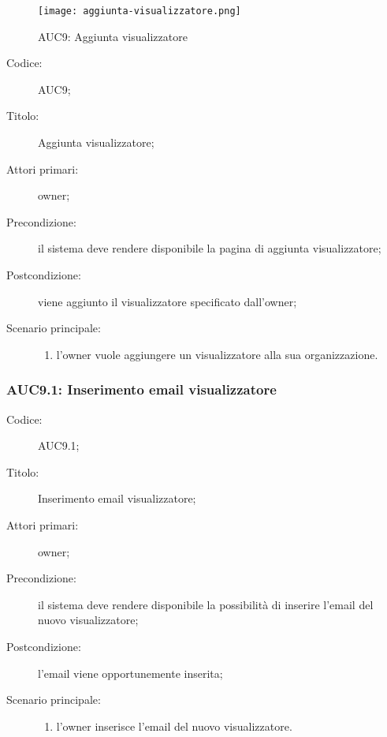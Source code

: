 \documentclass[../../../analisi-dei-requisiti.tex]{subfiles}
\begin{document}
\begin{figure}[H]
  \centering
  \texttt{[image: aggiunta-visualizzatore.png]}
  \caption{AUC9: Aggiunta visualizzatore}%
  \label{fig:AUC9}
\end{figure}

\begin{description}
  \item[Codice:] AUC9;
  \item[Titolo:] Aggiunta visualizzatore;
  \item[Attori primari:] owner;
  \item[Precondizione:] il sistema deve rendere disponibile la pagina di aggiunta visualizzatore;
  \item[Postcondizione:] viene aggiunto il visualizzatore specificato dall'owner;
  \item[Scenario principale:]
  \begin{enumerate}
    \item l'owner vuole aggiungere un visualizzatore alla sua organizzazione.
  \end{enumerate}
\end{description}

\subsubsection{AUC9.1: Inserimento email visualizzatore}%
\label{subs:AUC9.1}
\begin{description}
  \item[Codice:] AUC9.1;
  \item[Titolo:] Inserimento email visualizzatore;
  \item[Attori primari:] owner;
  \item[Precondizione:] il sistema deve rendere disponibile la possibilità di inserire l'email del nuovo visualizzatore;
  \item[Postcondizione:] l'email viene opportunemente inserita;
  \item[Scenario principale:]
  \begin{enumerate}
    \item l'owner inserisce l'email del nuovo visualizzatore.
  \end{enumerate}
\end{description}
\end{document}

